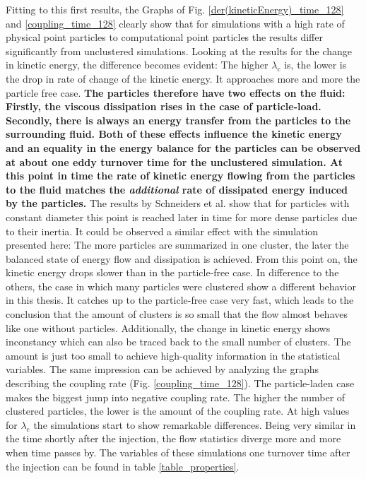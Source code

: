 \documentclass[11pt,a4paper,openany,oneside,parskip=half*]{article}
\begin{document}
Fitting to this first results, the Graphs of Fig. \ref{der(kineticEnergy)_time_128} and \ref{coupling_time_128} clearly show that for simulations with a high rate of physical point particles to computational point particles the results differ significantly from unclustered simulations. Looking at the results for the change in kinetic energy, the difference becomes evident: The higher $\lambda_\mathrm{c}$ is, the lower is the drop in rate of change of the kinetic energy. It approaches more and more the particle free case. 
\newline
\textbf{The particles therefore have two effects on the fluid: Firstly, the viscous dissipation rises in the case of particle-load. Secondly, there is always an energy transfer from the particles to the surrounding fluid. Both of these effects influence the kinetic energy and an equality in the energy balance for the particles can be observed at about one eddy turnover time for the unclustered simulation. At this point in time the rate of kinetic energy flowing from the particles to the fluid matches the \textit{additional} rate of dissipated energy induced by the particles.}
\newline
The results by Schneiders et al. \cite{Schneiders2017} show that for particles with constant diameter this point is reached later in time for more dense particles due to their inertia. It could be observed a similar effect with the simulation presented here: The more particles are summarized in one cluster, the later the balanced state of energy flow and dissipation is achieved. From this point on, the kinetic energy drops slower than in the particle-free case.
\newline
In difference to the others, the case in which many particles were clustered show a different behavior in this thesis. It catches up to the particle-free case very fast, which leads to the conclusion that the amount of clusters is so small that the flow almost behaves like one without particles. Additionally, the change in kinetic energy shows inconstancy which can also be traced back to the small number of clusters. The amount is just too small to achieve high-quality information in the statistical variables. 
\newline
The same impression can be achieved by analyzing the graphs describing the coupling rate (Fig. \ref{coupling_time_128}). The particle-laden case makes the biggest jump into negative coupling rate. The higher the number of clustered particles, the lower is the amount of the coupling rate. At high values for $\lambda_\mathrm{c}$ the simulations start to show remarkable differences. 
\newline
Being very similar in the time shortly after the injection, the flow statistics diverge more and more when time passes by. The variables of these simulations one turnover time after the injection can be found in table \ref{table_properties}. 
\end{document}
